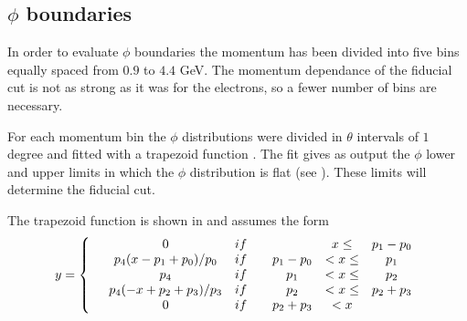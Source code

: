 \subsection{ $\phi$ boundaries}
In order to evaluate $\phi$ boundaries the momentum has been divided into five bins
equally spaced from $0.9$ to $4.4$ GeV. The momentum 
dependance of the fiducial cut is not as strong as it was for the electrons, so a fewer
number of bins are necessary.

For each momentum bin the $\phi$ distributions were divided in $\theta$ intervals
of $1$ degree and fitted with a trapezoid function \cite{bib:fid_p}. 
The fit gives as output the $\phi$ lower and upper limits in which the $\phi$ distribution
is flat (see ). These limits will determine the fiducial cut.

The trapezoid function is shown in  and assumes the form
\vspace{0.6cm}
$$
y =\left\{
\begin{array}{c c c c c c c}
  & 0                   &  if & &           &   x \le & p_1-p_0 \\
  & p_4(x-p_1+p_0)/p_0  &  if & & p_1-p_0   & < x \le & p_1\\
  & p_4                 &  if & & p_1       & < x \le & p_2 \\
  & p_4(-x+p_2+p_3)/p_3 &  if & & p_2       & < x \le & p_2 + p_3 \\
  & 0                   &  if & & p_2+p_3   & < x     & 
\end{array}
\right.
$$

